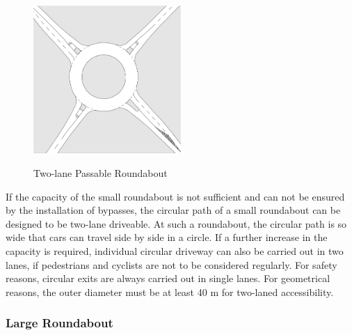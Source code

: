 \begin{figure}[!ht]
\caption{Two-lane Passable Roundabout \cite{man06}}
\includegraphics[width=0.5\textwidth]{bilder/twolaned_roundabout.png} %
\label{roundabout_twolaned}
\end{figure}

%
If the capacity of the small roundabout is not sufficient and can not be ensured by the installation of bypasses,
the circular path of a small roundabout can be designed to be two-lane driveable.
At such a roundabout, the circular path is so wide that cars can travel side by side in a circle.
If a further increase in the capacity is required, individual circular driveway can also be carried out in two lanes, if pedestrians and cyclists are not to be considered regularly.
For safety reasons, circular exits are always carried out in single lanes.
For geometrical reasons, the outer diameter must be at least 40 m for two-laned accessibility.\cite{man06}


\subsubsection{Large Roundabout}


